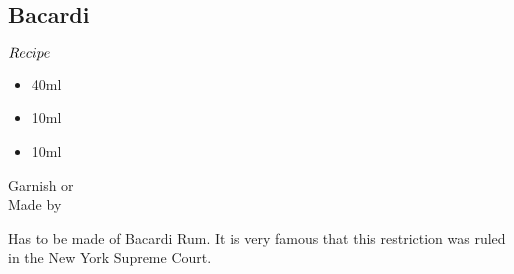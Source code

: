 \subsection{Bacardi}
\begin{itembox}[l]{\boldmath $Recipe$}
\begin{itemize}
\setlength{\parskip}{0cm}
\setlength{\itemsep}{0cm}
\item \bacardi 40ml
\item \limj 10ml
\item \gs 10ml
\end{itemize}
\vspace{-4mm}
Garnish \cherry or \strawberry\\
Made by \shake
\end{itembox}
Has to be made of Bacardi Rum. It is very famous that this restriction was ruled in the New York Supreme Court.
